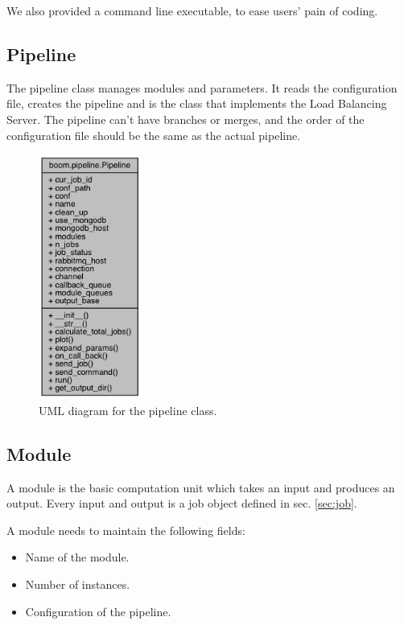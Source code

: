 \documentclass{article}
\begin{document}
    We also provided a command line executable, to ease users' pain of coding.


    \subsection{Pipeline}
    The pipeline class manages modules and parameters.
    It reads the configuration file, creates the pipeline and is the class that implements the Load Balancing Server.
    The pipeline can't have branches or merges, and the order of the configuration file should be the same as the actual pipeline.

    \begin{figure}[h]
        \begin{center}
            \includegraphics[width=0.3\textwidth]{fig/pipeline_uml.png}
        \end{center}
        \caption{UML diagram for the pipeline class.}\label{fig:pipeline_uml}
    \end{figure}

    \subsection{Module}
    A module is the basic computation unit which takes an input and produces an output.
    Every input and output is a job object defined in sec. \ref{sec:job}.

    A module needs to maintain the following fields:
    \begin{itemize}
        \item Name of the module.
        \item Number of instances.
        \item Configuration of the pipeline.
    \end{itemize}
\end{document}
